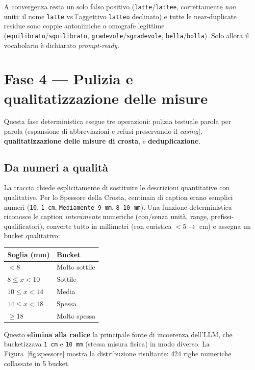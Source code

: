 \documentclass[11pt,a4paper]{article}
\begin{document}
A convergenza resta un solo falso positivo (\texttt{latte}/\texttt{lattee},
correttamente \emph{non} uniti: il nome \texttt{latte} vs l'aggettivo
\texttt{latteo} declinato) e tutte le near-duplicate residue sono coppie
antonimiche o omografe legittime (\texttt{equilibrato}/\texttt{squilibrato},
\texttt{gradevole}/\texttt{sgradevole}, \texttt{bella}/\texttt{bolla}). Solo
allora il vocabolario \`e dichiarato \emph{prompt-ready}.

\section{Fase 4 --- Pulizia e qualitatizzazione delle misure}

Questa fase deterministica esegue tre operazioni: pulizia testuale parola per
parola (espansione di abbreviazioni e refusi preservando il \emph{casing}),
\textbf{qualitatizzazione delle misure di crosta}, e \textbf{deduplicazione}.

\subsection{Da numeri a qualit\`a}
La traccia chiede esplicitamente di sostituire le descrizioni quantitative con
qualitative. Per lo Spessore della Crosta, centinaia di caption erano semplici
numeri (\texttt{10}, \texttt{1 cm}, \texttt{Mediamente 9 mm}, \texttt{8-10
mm}). Una funzione deterministica riconosce le caption \emph{interamente}
numeriche (con/senza unit\`a, range, prefissi-qualificatori), converte tutto in
millimetri (con euristica $<5 \rightarrow$ cm) e assegna un bucket
qualitativo:

\begin{center}\small
\begin{tabular}{@{}ll@{}}
\toprule
\textbf{Soglia (mm)} & \textbf{Bucket} \\
\midrule
$<8$ & Molto sottile \\
$8 \leq x < 10$ & Sottile \\
$10 \leq x < 14$ & Media \\
$14 \leq x < 18$ & Spessa \\
$\geq 18$ & Molto spessa \\
\bottomrule
\end{tabular}
\end{center}

Questo \textbf{elimina alla radice} la principale fonte di incoerenza
dell'LLM, che bucketizzava \texttt{1 cm} e \texttt{10 mm} (stessa misura
fisica) in modo diverso. La Figura~\ref{fig:spessore} mostra la distribuzione
risultante: 424 righe numeriche collassate in 5 bucket.
\end{document}
